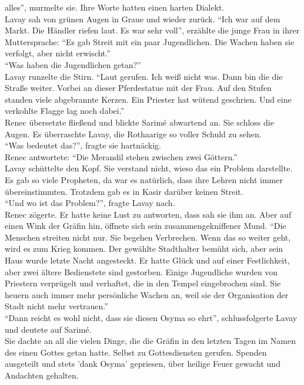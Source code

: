 alles'', murmelte sie. Ihre Worte hatten einen harten Dialekt.\\
Lavay sah von grünen Augen in Graue und wieder zurück. ``Ich war auf dem Markt. Die Händler riefen 
laut. Es war sehr voll'', erzählte die junge Frau in ihrer Muttersprache: ``Es gab Streit mit ein 
paar Jugendlichen. Die Wachen haben sie verfolgt, aber nicht erwischt.''\\
``Was haben die Jugendlichen getan?''\\
Lavay runzelte die Stirn. ``Laut gerufen. Ich weiß nicht was. Dann bin die die Straße weiter. 
Vorbei an dieser Pferdestatue mit der Frau. Auf den Stufen standen viele abgebrannte Kerzen. Ein 
Priester hat wütend geschrien. Und eine verkohlte Flagge lag noch dabei.''\\
Renec übersetzte fließend und blickte Sarimé abwartend an. Sie schloss die Augen. Es überraschte 
Lavay, die Rothaarige so voller Schuld zu sehen.\\
``Was bedeutet das?'', fragte sie hartnäckig.\\
Renec antwortete: ``Die Merandil stehen zwischen zwei Göttern.''\\
Lavay schüttelte den Kopf. Sie verstand nicht, wieso das ein Problem darstellte. Es gab so viele 
Propheten, da war es natürlich, dass ihre Lehren nicht immer übereinstimmten. Trotzdem gab es 
in Kasir darüber keinen Streit.\\
``Und wo ist das Problem?'', fragte Lavay nach.\\
Renec zögerte. Er hatte keine Lust zu antworten, dass sah sie ihm an. Aber auf einen Wink der 
Gräfin hin, öffnete sich sein zusammengekniffener Mund. ``Die Menschen streiten nicht nur. Sie 
begehen Verbrechen. Wenn das so weiter geht, wird es zum Krieg kommen. Der gewählte Stadthalter 
bemüht sich, aber sein Haus wurde letzte Nacht angesteckt. Er hatte Glück und auf einer Festlichkeit, aber zwei ältere Bedienstete sind gestorben. Einige Jugendliche wurden von Priestern 
verprügelt und verhaftet, die in den Tempel eingebrochen sind. Sie heuern auch immer mehr 
persönliche Wachen an, weil sie der Organisation der Stadt nicht mehr vertrauen.''\\
``Dann reicht es wohl nicht, dass sie diesen Osyma so ehrt'', schlussfolgerte Lavay und deutete auf 
Sarimé.\\
Sie dachte an all die vielen Dinge, die die Gräfin in den letzten Tagen im Namen des einen Gottes 
getan hatte. Selbst zu Gottesdiensten gerufen. Spenden ausgeteilt und stets 'dank Osyma' 
gepriesen, über heilige Feuer gewacht und Andachten gehalten.\\
